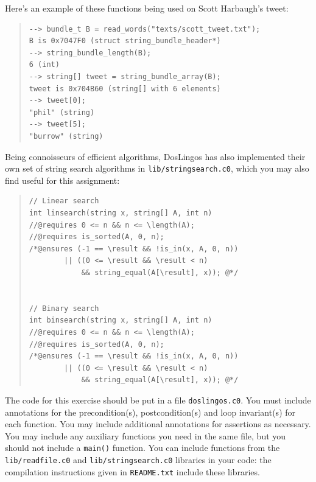 \documentclass[12pt]{exam}
\begin{document}
\noindent
Here's an example of these functions being used on Scott Harbaugh's
tweet:

\begin{quote}
\begin{lstlisting}[language={[coin]C}]
% coin -d lib/readfile.c0
--> bundle_t B = read_words("texts/scott_tweet.txt");
B is 0x7047F0 (struct string_bundle_header*)
--> string_bundle_length(B);
6 (int)
--> string[] tweet = string_bundle_array(B);
tweet is 0x704B60 (string[] with 6 elements)
--> tweet[0];
"phil" (string)
--> tweet[5];
"burrow" (string)
\end{lstlisting}
\end{quote}

Being connoisseurs of efficient algorithms, DosLingos has also implemented
their own set of string search algorithms in \lstinline"lib/stringsearch.c0", which
you may also find useful for this assignment:
\begin{quote}
\begin{lstlisting}[numbers=none]
// Linear search
int linsearch(string x, string[] A, int n)
//@requires 0 <= n && n <= \length(A);
//@requires is_sorted(A, 0, n);
/*@ensures (-1 == \result && !is_in(x, A, 0, n))
        || ((0 <= \result && \result < n)
            && string_equal(A[\result], x)); @*/


// Binary search
int binsearch(string x, string[] A, int n)
//@requires 0 <= n && n <= \length(A);
//@requires is_sorted(A, 0, n);
/*@ensures (-1 == \result && !is_in(x, A, 0, n))
        || ((0 <= \result && \result < n)
            && string_equal(A[\result], x)); @*/
\end{lstlisting}
\end{quote}



The code for this exercise should be put in a file
\lstinline'doslingos.c0'. You must include annotations for the
precondition(s), postcondition(s) and loop invariant(s) for each
function. You may include additional annotations for assertions as
necessary.
You may include any auxiliary functions you need in the same file, but
you should not include a \lstinline"main()" function.  You can include
functions from the \lstinline'lib/readfile.c0' and \lstinline'lib/stringsearch.c0'
libraries in your code: the compilation instructions given in
\lstinline'README.txt' include these libraries.

\end{document}
